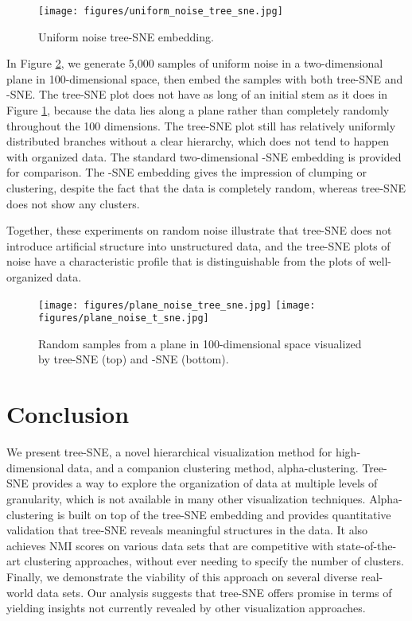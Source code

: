 \documentclass{article}
\begin{document}
\begin{figure}[htp]
    \centering
    \captionsetup{width=.9\linewidth}
    \texttt{[image: figures/uniform\_noise\_tree\_sne.jpg]}
    \caption{Uniform noise tree-SNE embedding.}
    \label{fig:noise-tree-SNE}
\end{figure}

In Figure \ref{fig:plane-noise}, we generate 5,000 samples of uniform noise in a two-dimensional plane in 100-dimensional space, then embed the samples with both tree-SNE and -SNE. The tree-SNE plot does not have as long of an initial stem as it does in Figure \ref{fig:noise-tree-SNE}, because the data lies along a plane rather than completely randomly throughout the 100 dimensions. The tree-SNE plot still has relatively uniformly distributed branches without a clear hierarchy, which does not tend to happen with organized data. The standard two-dimensional -SNE embedding is provided for comparison. The -SNE embedding gives the impression of clumping or clustering, despite the fact that the data is completely random, whereas tree-SNE does not show any clusters. 

Together, these experiments on random noise illustrate that tree-SNE does not introduce artificial structure into unstructured data, and the tree-SNE plots of noise have a characteristic profile that is distinguishable from the plots of well-organized data. 

\begin{figure}[htp]
    \centering
    \captionsetup{width=.9\linewidth}
    \texttt{[image: figures/plane\_noise\_tree\_sne.jpg]}
    \texttt{[image: figures/plane\_noise\_t\_sne.jpg]}
    \caption{Random samples from a plane in 100-dimensional space visualized by tree-SNE (top) and -SNE (bottom).}
    \label{fig:plane-noise}
\end{figure}



\section{Conclusion}

We present tree-SNE, a novel hierarchical visualization method for high-dimensional data, and a companion clustering method, alpha-clustering. Tree-SNE provides a way to explore the organization of data at multiple levels of granularity, which is not available in many other visualization techniques. Alpha-clustering is built on top of the tree-SNE embedding and provides quantitative validation that tree-SNE reveals meaningful structures in the data. It also achieves NMI scores on various data sets that are competitive with state-of-the-art clustering approaches, without ever needing to specify the number of clusters. Finally, we demonstrate the viability of this approach on several diverse real-world data sets. Our analysis suggests that tree-SNE offers promise in terms of yielding insights not currently revealed by other visualization approaches. 
\end{document}
